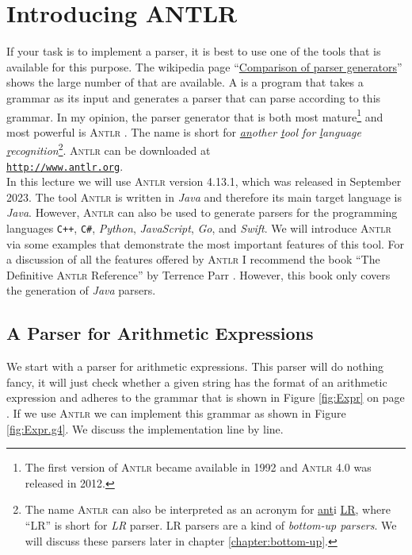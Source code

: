 \chapter{Introducing ANTLR \label{chapter:antlr}}
If your task is to implement a parser, it is best to use one of the tools that is available for this purpose.
The wikipedia page 
``\href{https://en.wikipedia.org/wiki/Comparison_of_parser_generators}{Comparison of parser generators}'' 
shows the large number of  that are available.  
A   is a program that takes a grammar as
its input and generates a parser that can parse according to this grammar.
In my opinion, the parser generator that is both most mature\footnote{
  The first version of \textsc{Antlr} became available in 1992 and \textsc{Antlr} 4.0 was released in 2012.
} and most powerful is
\textsc{Antlr}  \cite{parr:2013,parr:2014}.  The name is short for 
\emph{\underline{an}other \underline{t}ool for \underline{l}anguage \underline{r}ecognition}\footnote{
  The name \textsc{Antlr} can also be interpreted as an acronym for \underline{ant}i \underline{LR},
  where ``LR'' is short for \emph{LR} parser.  LR parsers are a kind of \emph{bottom-up parsers}.  We will discuss these
  parsers later in chapter \ref{chapter:bottom-up}.
}.
\textsc{Antlr} can be downloaded at 
\\[0.2cm]
\hspace*{1.3cm}
\href{http://www.antlr.org}{\texttt{http://www.antlr.org}}.
\\[0.2cm]
In this lecture we will use \textsc{Antlr} version 4.13.1, which was released in September 2023.  The tool
\textsc{Antlr} is written in \textsl{Java} 
and therefore its main target language is \textsl{Java}.  However, \textsc{Antlr} can also be used to generate
parsers for the programming languages \texttt{C++}, \texttt{C\#}, \textsl{Python}, \textsl{JavaScript},
\textsl{Go}, and \textsl{Swift}. 
We will introduce \textsc{Antlr} via some examples that demonstrate the most important features of this tool.
For a discussion of all the features offered by \textsc{Antlr} I recommend the book 
``The Definitive \textsc{Antlr} Reference'' by Terrence Parr \cite{parr:2013}.  However, this book only covers
the generation of \textsl{Java} parsers. 

\section{A Parser for Arithmetic Expressions}
We start with a parser for arithmetic expressions.  This parser will do nothing fancy, it will just check
whether a given string has the format of an arithmetic expression and adheres to 
the grammar that is shown in Figure \ref{fig:Expr} on page \pageref{fig:Expr}.
If we use \textsc{Antlr} we can implement this grammar as shown in Figure \ref{fig:Expr.g4}.  
We discuss the implementation line by line.


